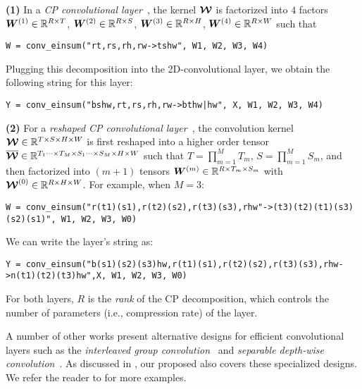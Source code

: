 {\bf (1)} In a {\em CP convolutional layer}~\citep{lebedev2015speeding}, the kernel $\bm{\mathcal{W}}$ is factorized into $4$ factors $\bm{W}^{(1)} \in \mathbb{R}^{R \times T}$, $\bm{W}^{(2)} \in \mathbb{R}^{R \times S}$, $\bm{W}^{(3)} \in \mathbb{R}^{R \times H}$, $\bm{W}^{(4)} \in \mathbb{R}^{R \times W}$ such that
\begin{lstlisting}
W = conv_einsum("rt,rs,rh,rw->tshw", W1, W2, W3, W4)
\end{lstlisting}
\vspace{-1em}
Plugging this decomposition into the 2D-convolutional layer, we obtain the following \conveinsum string for this layer:
\begin{lstlisting}
Y = conv_einsum("bshw,rt,rs,rh,rw->bthw|hw", X, W1, W2, W3, W4)
\end{lstlisting}
\vspace{-1em}

{\bf (2)} For a {\em reshaped CP convolutional layer}~\citep{su2018tensorial}, the convolution kernel $\bm{\mathcal{W}} \in \mathbb{R}^{T \times S \times H \times W}$ is first reshaped into a higher order tensor $\bm{\mathcal{\overline{W}}} \in \mathbb{R}^{T_1 \cdots \times T_M \times S_1 \cdots \times S_M \times H \times W}$ such that $T = \prod_{m = 1}^{M} T_m$, $S = \prod_{m = 1}^{M} S_m$, and then factorized into $(m + 1)$ tensors $\bm{W}^{(m)} \in \mathbb{R}^{R \times T_m \times S_m}$ with $\bm{\mathcal{W}}^{(0)} \in \mathbb{R}^{R \times H \times W}$. For example, when $M = 3$:
\begin{lstlisting}
W = conv_einsum("r(t1)(s1),r(t2)(s2),r(t3)(s3),rhw"->(t3)(t2)(t1)(s3)(s2)(s1)", W1, W2, W3, W0)
\end{lstlisting}
\vspace{-1em}
We can write the layer's \conveinsum string as:
\begin{lstlisting}
Y = conv_einsum("b(s1)(s2)(s3)hw,r(t1)(s1),r(t2)(s2),r(t3)(s3),rhw->n(t1)(t2)(t3)hw",X, W1, W2, W3, W0)
\end{lstlisting}
\vspace{-1em}

For both layers, $R$ is the {\em rank} of the CP decomposition, which controls the number of parameters (i.e., compression rate) of the layer.

A number of other works present alternative designs for efficient convolutional layers such as the \emph{interleaved group convolution}~\citep{zhang2017interleaved} and \emph{separable depth-wise convolution}~\citep{chollet2017xception}. As discussed in , our proposed \conveinsum also covers these specialized designs. We refer the reader to \citet{su2018tensorial,hayashi2019exploring}  for more examples.
